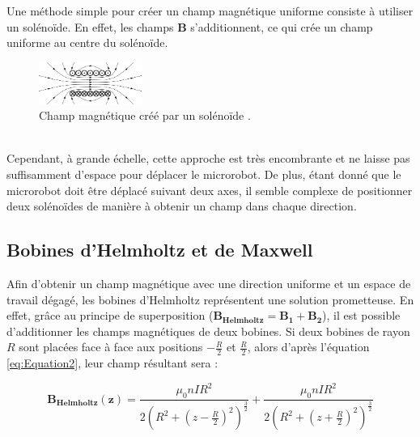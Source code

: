 \documentclass{article}
\begin{document}
        \noindent
       Une méthode simple pour créer un champ magnétique uniforme consiste à utiliser un solénoïde. En effet, les champs $\mathbf{B}$ s'additionnent, ce qui crée un champ uniforme au centre du solénoïde. 
        \begin{figure}[h] %
            \centering
            \includegraphics[width=0.3\textwidth]{Images/Solenoid.png}
            \caption{Champ magnétique créé par un solénoïde \cite{ref5}.}
            \label{fig:image}
        \end{figure}\\
\noindent
Cependant, à grande échelle, cette approche est très encombrante et ne laisse pas suffisamment d'espace pour déplacer le microrobot. De plus, étant donné que le microrobot doit être déplacé suivant deux axes, il semble complexe de positionner deux solénoïdes de manière à obtenir un champ dans chaque direction.
        
\subsection{Bobines d'Helmholtz et de Maxwell}
    Afin d'obtenir un champ magnétique avec une direction uniforme et un espace de travail dégagé, les bobines d'Helmholtz représentent une solution prometteuse. En effet, grâce au principe de superposition (\( \mathbf{B_{\text{Helmholtz}}} = \mathbf{B_{1}} + \mathbf{B_{2}} \)), il est possible d'additionner les champs magnétiques de deux bobines. Si deux bobines de rayon \( R \) sont placées face à face aux positions \( -\frac{R}{2} \) et \( \frac{R}{2} \), alors d'après l'équation \eqref{eq:Equation2}, leur champ résultant sera :

    \begin{equation}
        \mathbf{B_{Helmholtz}(z)} = \frac{\mu_0nIR^{2}}{2(R^{2}+(z-\frac{R}{2})^{2})^{\frac{3}{2}}} + \frac{\mu_0nIR^{2}}{2(R^{2}+(z+\frac{R}{2})^{2})^{\frac{3}{2}}}\label{eq:Equation3}
    \end{equation}
    
\end{document}

